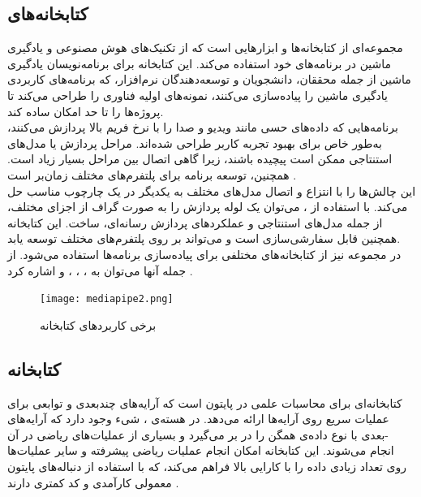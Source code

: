 \subsection{کتابخانه‌های }
 مجموعه‌ای از کتابخانه‌ها و ابزارهایی است که از تکنیک‌های هوش مصنوعی و یادگیری ماشین در برنامه‌های خود استفاده می‌کند. این کتابخانه برای برنامه‌نویسان یادگیری ماشین از جمله محققان، دانشجویان و توسعه‌دهندگان
 نرم‌افزار، که برنامه‌های کاربردی یادگیری ماشین را پیاده‌سازی می‌کنند، نمونه‌های اولیه فناوری را طراحی می‌کند تا پروژه‌ها را تا حد امکان ساده کند.
\\
برنامه‌هایی که داده‌های حسی مانند ویدیو و صدا را با نرخ فریم بالا پردازش می‌کنند، به‌طور خاص برای بهبود تجربه کاربر
 طراحی شده‌اند. مراحل پردازش یا مدل‌های استنتاجی ممکن است پیچیده باشند، زیرا گاهی اتصال بین مراحل بسیار زیاد است. همچنین، توسعه برنامه برای پلتفرم‌های مختلف زمان‌بر است \cite{lugaresi2019mediapipe}. 
\\
 این چالش‌ها را با انتزاع و اتصال مدل‌های مختلف به یکدیگر در یک چارچوب مناسب حل می‌کند. با استفاده از ، می‌توان یک لوله پردازش را به صورت گراف از اجزای مختلف، از جمله مدل‌های استنتاجی و عملکردهای پردازش رسانه‌ای، ساخت. این کتابخانه همچنین قابل سفارشی‌سازی است و می‌تواند بر روی پلتفرم‌های مختلف توسعه یابد.
\\
در مجموعه  نیز از کتابخانه‌های مختلفی برای پیاده‌سازی برنامه‌ها استفاده می‌شود. از جمله آنها می‌توان به ، ، ،  و  اشاره کرد \cite{harris2021applying}.


\begin{figure}[h]
    \centering
    \texttt{[image: mediapipe2.png]}
    \caption{برخی کاربردهای کتابخانه }
\end{figure}

\subsection{کتابخانه }
 کتابخانه‌ای برای محاسبات علمی در پایتون است که آرایه‌های چندبعدی و توابعی برای عملیات سریع روی آرایه‌ها ارائه می‌دهد. در هسته‌ی ، شیء  وجود 
دارد که آرایه‌های -بعدی با نوع داده‌ی همگن را در بر می‌گیرد و بسیاری از عملیات‌های ریاضی در آن انجام می‌شوند. این کتابخانه امکان انجام عملیات ریاضی پیشرفته و سایر 
عملیات‌ها روی تعداد زیادی داده را با کارایی بالا فراهم می‌کند، که با استفاده از دنباله‌های پایتون معمولی کارآمدی و کد کمتری دارند \cite{WhatisNu62:online}.

